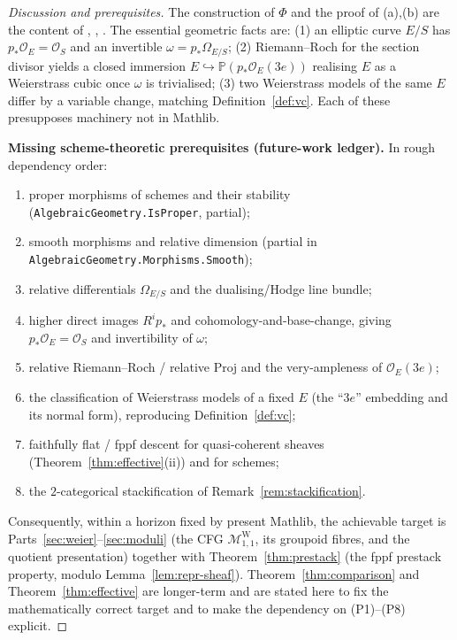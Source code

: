 \documentclass[11pt]{article}
\theoremstyle{definition}
\theoremstyle{plain}
\theoremstyle{remark}
\newcommand{\MW}{\mathcal{M}^{\mathrm{W}}_{1,1}}
\begin{document}
\begin{proof}[Discussion and prerequisites]
The construction of $\Phi$ and the proof of (a),(b) are the content of
\cite[II.2, III.1, III.3]{Silverman}, \cite[\S2.1--2.2]{Deligne1975},
\cite[Ch.~2]{KatzMazur}.  The essential geometric facts are: (1) an elliptic
curve $E/S$ has $p_*\mathcal O_E=\mathcal O_S$ and an invertible
$\omega=p_*\Omega_{E/S}$; (2) Riemann--Roch for the section divisor yields a
closed immersion $E\hookrightarrow\mathbb P(p_*\mathcal O_E(3e))$ realising $E$
as a Weierstrass cubic once $\omega$ is trivialised; (3) two Weierstrass models of
the same $E$ differ by a variable change, matching
Definition~\ref{def:vc}.  Each of these presupposes machinery not in Mathlib.

\medskip\noindent\textbf{Missing scheme-theoretic prerequisites
(future-work ledger).}  In rough dependency order:
\begin{enumerate}[label=(P\arabic*),leftmargin=3.2em]
\item proper morphisms of schemes and their stability
      (\texttt{AlgebraicGeometry.IsProper}, partial);
\item smooth morphisms and relative dimension (partial in
      \texttt{AlgebraicGeometry.Morphisms.Smooth});
\item relative differentials $\Omega_{E/S}$ and the dualising/Hodge line bundle;
\item higher direct images $R^i p_*$ and cohomology-and-base-change, giving
      $p_*\mathcal O_E=\mathcal O_S$ and invertibility of $\omega$;
\item relative Riemann--Roch / relative $\mathrm{Proj}$ and the very-ampleness of
      $\mathcal O_E(3e)$;
\item the classification of Weierstrass models of a fixed $E$ (the ``$3e$''
      embedding and its normal form), reproducing Definition~\ref{def:vc};
\item faithfully flat / fppf descent for quasi-coherent sheaves
      (Theorem~\ref{thm:effective}(ii)) and for schemes;
\item the $2$-categorical stackification of Remark~\ref{rem:stackification}.
\end{enumerate}
Consequently, within a horizon fixed by present Mathlib, the achievable target is
Parts~\ref{sec:weier}--\ref{sec:moduli} (the CFG $\MW$, its groupoid fibres, and
the quotient presentation) together with Theorem~\ref{thm:prestack} (the fppf
prestack property, modulo Lemma~\ref{lem:repr-sheaf}).  Theorem~\ref{thm:comparison}
and Theorem~\ref{thm:effective} are longer-term and are stated here to fix the
mathematically correct target and to make the dependency on (P1)--(P8) explicit.
\end{proof}
\end{document}

